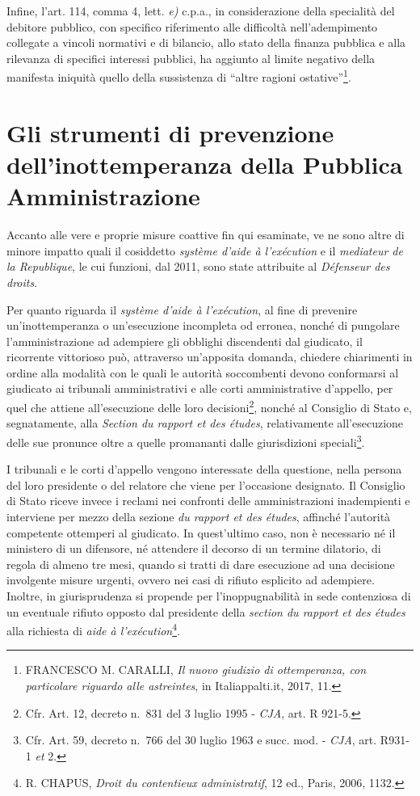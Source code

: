 \documentclass[12pt,it,a4paper,]{report}
\begin{document}
Infine, l'art. 114, comma 4, lett. \emph{e)} c.p.a., in considerazione
della specialità del debitore pubblico, con specifico riferimento alle
difficoltà nell'adempimento collegate a vincoli normativi e di bilancio,
allo stato della finanza pubblica e alla rilevanza di specifici
interessi pubblici, ha aggiunto al limite negativo della manifesta
iniquità quello della sussistenza di ``altre ragioni
ostative''\footnote{FRANCESCO M. CARALLI, \emph{Il nuovo giudizio di
  ottemperanza, con particolare riguardo alle astreintes}, in
  Italiappalti.it, 2017, 11.}.

\hypertarget{gli-strumenti-di-prevenzione-dellinottemperanza-della-pubblica-amministrazione}{%
\section{Gli strumenti di prevenzione dell'inottemperanza della Pubblica
Amministrazione}\label{gli-strumenti-di-prevenzione-dellinottemperanza-della-pubblica-amministrazione}}

Accanto alle vere e proprie misure coattive fin qui esaminate, ve ne
sono altre di minore impatto quali il cosiddetto \emph{système d'aide à
l'exécution} e il \emph{mediateur de la Republique}, le cui funzioni,
dal 2011, sono state attribuite al \emph{Défenseur des droits}.

Per quanto riguarda il \emph{système d'aide à l'exécution}, al fine di
prevenire un'inottemperanza o un'esecuzione incompleta od erronea,
nonché di pungolare l'amministrazione ad adempiere gli obblighi
discendenti dal giudicato, il ricorrente vittorioso può, attraverso
un'apposita domanda, chiedere chiarimenti in ordine alla modalità con le
quali le autorità soccombenti devono conformarsi al giudicato ai
tribunali amministrativi e alle corti amministrative d'appello, per quel
che attiene all'esecuzione delle loro decisioni\footnote{Cfr. Art. 12,
  decreto n.~831 del 3 luglio 1995 - \emph{CJA}, art. R 921-5.}, nonché
al Consiglio di Stato e, segnatamente, alla \emph{Section du rapport et
des études}, relativamente all'esecuzione delle sue pronunce oltre a
quelle promananti dalle giurisdizioni speciali\footnote{Cfr. Art. 59,
  decreto n.~766 del 30 luglio 1963 e succ. mod. - \emph{CJA}, art.
  R931-1 \emph{et} 2.}.

I tribunali e le corti d'appello vengono interessate della questione,
nella persona del loro presidente o del relatore che viene per
l'occasione designato. Il Consiglio di Stato riceve invece i reclami nei
confronti delle amministrazioni inadempienti e interviene per mezzo
della sezione \emph{du rapport et des études}, affinché l'autorità
competente ottemperi al giudicato. In quest'ultimo caso, non è
necessario né il ministero di un difensore, né attendere il decorso di
un termine dilatorio, di regola di almeno tre mesi, quando si tratti di
dare esecuzione ad una decisione involgente misure urgenti, ovvero nei
casi di rifiuto esplicito ad adempiere. Inoltre, in giurisprudenza si
propende per l'inoppugnabilità in sede contenziosa di un eventuale
rifiuto opposto dal presidente della \emph{section du rapport et des
études} alla richiesta di \emph{aide à l'exécution}\footnote{R. CHAPUS,
  \emph{Droit du contentieux administratif}, 12 ed., Paris, 2006, 1132.}.
\end{document}
